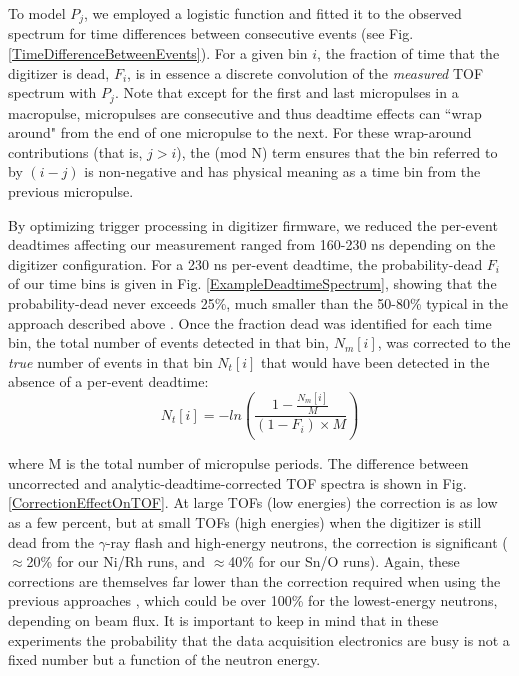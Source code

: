To model $P_{j}$, we
employed a logistic function and fitted it to the observed spectrum for time
differences between consecutive events (see Fig.  \ref{TimeDifferenceBetweenEvents}).
For a given bin $i$, the fraction of time that the 
digitizer is dead, $F_{i}$, is in essence a discrete convolution of the
\textit{measured} TOF spectrum with $P_{j}$. Note that except for the first and
last micropulses in a macropulse, micropulses are consecutive and thus deadtime effects can
``wrap around" from the end of one micropulse to the next. For these wrap-around
contributions (that is, $j>i$), the (mod N) term ensures that the bin referred
to by $(i-j)$ is non-negative and has physical meaning as a time bin from the previous 
micropulse.

By optimizing trigger processing in digitizer firmware,
we reduced the per-event deadtimes affecting our
measurement ranged from 160-230 ns depending on the digitizer configuration.
For a 230 ns per-event deadtime, the probability-dead
$F_{i}$ of our time bins is given in Fig.
\ref{ExampleDeadtimeSpectrum}, showing that the probability-dead never exceeds
25\%, much smaller than the 50-80\% typical in the approach described above
\cite{Finlay1993, Abfalterer2001}.
Once the fraction dead was identified for each time bin, the total number of
events detected in that bin, $N_{m}[i]$, was corrected to the \textit{true}
number of events in that bin $N_{t}[i]$ that would have been detected in the
absence of a per-event deadtime:
\begin{equation} \label{DeadtimeEquation}
    N_{t}[i] = -ln\left(\frac{1-\frac{N_m[i]}{M}}{(1-F_{i})\times M}\right)
\end{equation}

\noindent
where M is the total number of micropulse periods. The difference between
uncorrected and analytic-deadtime-corrected TOF spectra is shown in Fig.
\ref{CorrectionEffectOnTOF}. At large TOFs (low energies) the correction is as low as a
few percent, but at small TOFs (high energies) when the digitizer is still dead
from the $\gamma$-ray flash and high-energy neutrons, the correction is significant
($\approx$20\% for our Ni/Rh runs, and $\approx$40\% for our Sn/O runs). Again, these 
corrections are themselves far lower than the correction required
when using the previous approaches \cite{Finlay1993, Abfalterer2001}, which
could be over 100\% for the lowest-energy neutrons, depending on beam flux. It is
important to keep in mind that in these experiments the probability that the
data acquisition electronics are busy is not a fixed number but a
function of the neutron energy.

